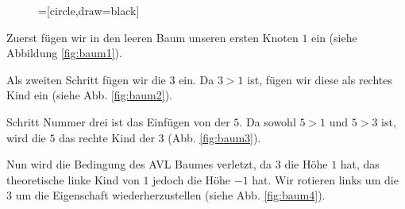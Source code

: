 \documentclass[ngerman,landscape,twocolumn]{adtexsheet}
\begin{document}
\begin{question}
\begin{enumerate}
        \begin{figure}
            \hfill
            \newcommand{\sep}{0.1}
            =[circle,draw=black]
            \minipage[b]{\sep\textwidth}
                \centering
                \caption{}
                \label{fig:baum5}
            \endminipage\hfill
            \minipage[b]{\sep\textwidth}
                \centering
                \caption{}
                \label{fig:baum6}
            \endminipage\hfill
            \minipage[b]{\sep\textwidth}%
                \centering
                \caption{}
                \label{fig:baum7}
            \endminipage\hfill
            \minipage[b]{\sep\textwidth}%
                \centering
                \caption{}
                \label{fig:baum8}
            \endminipage
        \end{figure}
        
        Zuerst fügen wir in den leeren Baum unseren ersten Knoten $1$ ein (siehe Abbildung \ref{fig:baum1}).
        
        Als zweiten Schritt fügen wir die $3$ ein. Da $3 > 1$ ist, fügen wir diese als rechtes Kind ein (siehe Abb. \ref{fig:baum2}).
        
        Schritt Nummer drei ist das Einfügen von der $5$. Da sowohl $5>1$ und $5>3$ ist, wird die $5$ das rechte Kind der $3$ (Abb. \ref{fig:baum3}).
        
        Nun wird die Bedingung des AVL Baumes verletzt, da $3$ die Höhe $1$ hat, das theoretische linke Kind von $1$ jedoch die Höhe $-1$ hat. Wir rotieren links um die $3$ um die Eigenschaft wiederherzustellen (siehe Abb. \ref{fig:baum4}).
        

\end{enumerate}
\end{question}
\end{document}
